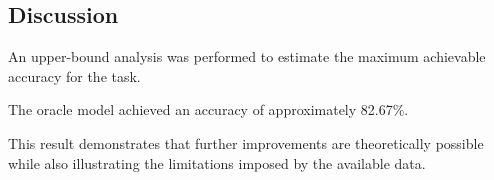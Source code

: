 \subsection{Discussion}\label{sec:discussion}

An upper-bound analysis was performed to estimate the maximum achievable
accuracy for the task.

The oracle model achieved an accuracy of approximately 82.67\%.

This result demonstrates that further improvements are theoretically
possible while also illustrating the limitations imposed by the
available data.
